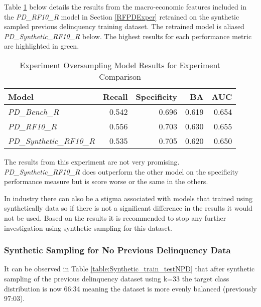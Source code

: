 Table \ref{table:benchmodelSyntheticExperPD} below details the results from the macro-economic features included in the \textit{PD\_RF10\_R} model in Section \ref{RFPDExper} retrained on the synthetic sampled previous delinquency training dataset. The retrained model is aliased \textit{PD\_Synthetic\_RF10\_R} below. The highest results for each performance metric are highlighted in green.


\begin{table}[H]
	\centering
	\small
	\begin{tabular}{l  r r r r}
		\hline
		\textbf{Model} & \textbf{Recall} & \textbf{Specificity} & \textbf{BA} & \textbf{AUC}  \\ \hline
		\textit{PD\_Bench\_R} & 0.542 & 0.696 & 0.619 & \cellcolor{green!25}0.654 \\ \hline
		\textit{PD\_RF10\_R} & \cellcolor{green!25}0.556 & 0.703 & \cellcolor{green!25}0.630 & 0.655  \\ 
		\textit{PD\_Synthetic\_RF10\_R}  & 0.535 & \cellcolor{green!25}0.705 & 0.620 & 0.650   \\ \hline
	\end{tabular}
	\caption{Experiment Oversampling Model Results for Experiment Comparison}
	\label{table:benchmodelSyntheticExperPD}
\end{table}

The results from this experiment are not very promising. \textit{PD\_Synthetic\_RF10\_R} does outperform the other model on the specificity performance measure but is score worse or the same in the others.

In industry there can also be a stigma associated with models that trained using synthetically data so if there is not a significant difference in the results it would not be used. Based on the results it is recommended to stop any further investigation using synthetic sampling for this dataset.

\subsubsection{Synthetic Sampling for No Previous Delinquency Data}
It can be observed in Table \ref{table:Synthetic_train_testNPD} that after synthetic sampling of the previous delinquency dataset using k=33 the target class distribution is now 66:34  meaning the dataset is more evenly balanced (previously 97:03).

